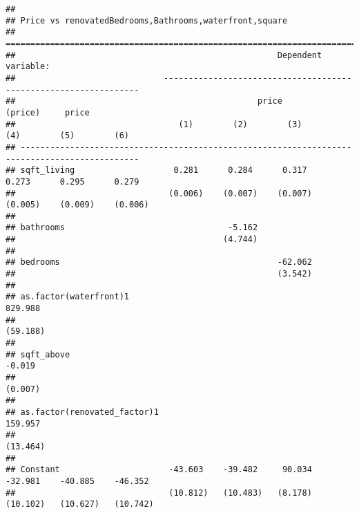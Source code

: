 \documentclass[
]{article}
\begin{document}
\begin{verbatim}
## 
## Price vs renovatedBedrooms,Bathrooms,waterfront,square
## ==============================================================================================
##                                                     Dependent variable:                       
##                              -----------------------------------------------------------------
##                                                 price                     (price)     price   
##                                 (1)        (2)        (3)        (4)        (5)        (6)    
## ----------------------------------------------------------------------------------------------
## sqft_living                    0.281      0.284      0.317      0.273      0.295      0.279   
##                               (0.006)    (0.007)    (0.007)    (0.005)    (0.009)    (0.006)  
##                                                                                               
## bathrooms                                 -5.162                                              
##                                          (4.744)                                              
##                                                                                               
## bedrooms                                            -62.062                                   
##                                                     (3.542)                                   
##                                                                                               
## as.factor(waterfront)1                                         829.988                        
##                                                                (59.188)                       
##                                                                                               
## sqft_above                                                                 -0.019             
##                                                                           (0.007)             
##                                                                                               
## as.factor(renovated_factor)1                                                         159.957  
##                                                                                      (13.464) 
##                                                                                               
## Constant                      -43.603    -39.482     90.034    -32.981    -40.885    -46.352  
##                               (10.812)   (10.483)   (8.178)    (10.102)   (10.627)   (10.742) 

\end{verbatim}
\end{document}
